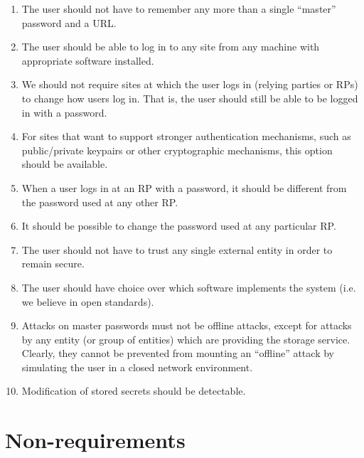\documentclass[a4paper,titlepage]{article}
\begin{document}
\begin{enumerate}

  \item The user should not have to remember any more than a single
    ``master'' password and a URL.

  \item The user should be able to log in to any site from any machine
    with appropriate software installed.

  \item We should not require sites at which the user logs in (relying
    parties or RPs) to change how users log in. That is, the user
    should still be able to be logged in with a password.

  \item For sites that want to support stronger authentication
    mechanisms, such as public/private keypairs or other cryptographic
    mechanisms, this option should be available.

  \item When a user logs in at an RP with a password, it should be
    different from the password used at any other RP.

  \item It should be possible to change the password used at any
    particular RP.

  \item The user should not have to trust any single external entity
    in order to remain secure.

  \item The user should have choice over which software implements the
    system (i.e. we believe in open standards).

  \item Attacks on master passwords must not be offline attacks,
    except for attacks by any entity (or group of entities) which are
    providing the storage service. Clearly, they cannot be prevented
    from mounting an ``offline'' attack by simulating the user in a
    closed network environment.

  \item Modification of stored secrets should be detectable.

\end{enumerate}

\section{Non-requirements}
\end{document}

